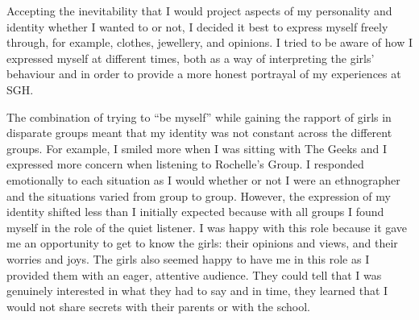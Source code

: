 Accepting the inevitability that I would project aspects of my personality and identity whether I wanted to or not, I decided it best to express myself freely through, for example, clothes, jewellery, and opinions. I tried to be aware of how I expressed myself at different times, both as a way of interpreting the girls' behaviour and in order to provide a more honest portrayal of my experiences at SGH. 

The combination of trying to ``be myself'' while gaining the rapport of girls in disparate groups meant that my identity was not constant across the different groups. For example, I smiled more when I was sitting with The Geeks and I expressed more concern when listening to Rochelle's Group. I responded emotionally to each situation as I would whether or not I were an ethnographer and the situations varied from group to group. However, the expression of my identity shifted less than I initially expected because with all groups I found myself in the role of the quiet listener. I was happy with this role because it gave me an opportunity to get to know the girls: their opinions and views, and their worries and joys. The girls also seemed happy to have me in this role as I provided them with an eager, attentive audience. They could tell that I was genuinely interested in what they had to say and in time, they learned that I would not share secrets with their parents or with the school.

